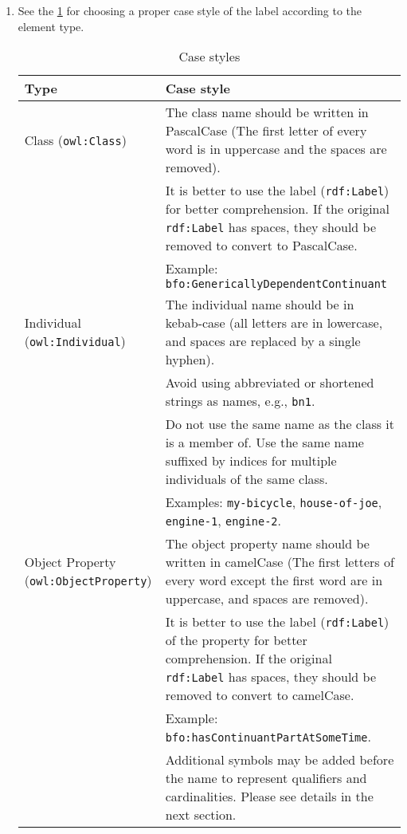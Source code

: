 \begin{enumerate}
    \item See the \cref{case-style-table} for choosing a proper case style of the label according to the element type.

\begin{table}[]
\caption{Case styles}
\label{case-style-table}
\begin{tabular}
{|>{\raggedright\arraybackslash}m{3.8cm}|>{\raggedright\arraybackslash}m{10cm}|}
\hline
\textbf{Type} & \textbf{Case style} \\ \hline

Class (\texttt{owl:Class}) & 
The class name should be written in PascalCase (The first letter of every word is in uppercase and the spaces are removed). \\
& It is better to use the label (\texttt{rdf:Label}) for better comprehension. If the original \texttt{rdf:Label} has spaces, they should be removed to convert to PascalCase. \\
& Example: \texttt{bfo:GenericallyDependentContinuant} \\ \hline

Individual (\texttt{owl:Individual}) & 
The individual name should be in kebab-case (all letters are in lowercase, and spaces are replaced by a single hyphen). \\
& Avoid using abbreviated or shortened strings as names, e.g., \texttt{bn1}. \\
& Do not use the same name as the class it is a member of. Use the same name suffixed by indices for multiple individuals of the same class. \\
& Examples: \texttt{my-bicycle}, \texttt{house-of-joe}, \texttt{engine-1}, \texttt{engine-2}. \\ \hline

Object Property (\texttt{owl:ObjectProperty}) & 
The object property name should be written in camelCase (The first letters of every word except the first word are in uppercase, and spaces are removed). \\
& It is better to use the label (\texttt{rdf:Label}) of the property for better comprehension. If the original \texttt{rdf:Label} has spaces, they should be removed to convert to camelCase. \\
& Example: \texttt{bfo:hasContinuantPartAtSomeTime}. \\
& Additional symbols may be added before the name to represent qualifiers and cardinalities. Please see details in the next section. \\ \hline


\end{tabular}
\end{table}
\end{enumerate}
